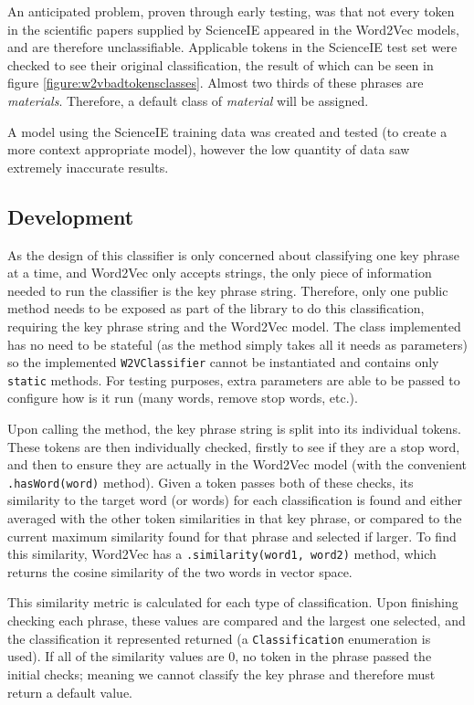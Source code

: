 An anticipated problem, proven through early testing, was that not every token in the scientific papers supplied by ScienceIE appeared in the Word2Vec models, and are therefore unclassifiable. Applicable tokens in the ScienceIE test set were checked to see their original classification, the result of which can be seen in figure \ref{figure:w2vbadtokensclasses}. Almost two thirds of these phrases are \textit{materials}. Therefore, a default class of \textit{material} will be assigned.

A model using the ScienceIE training data was created and tested (to create a more context appropriate model), however the low quantity of data saw extremely inaccurate results.

\subsection{Development}
As the design of this classifier is only concerned about classifying one key phrase at a time, and Word2Vec only accepts strings, the only piece of information needed to run the classifier is the key phrase string. Therefore, only one public method needs to be exposed as part of the library to do this classification, requiring the key phrase string and the Word2Vec model. The class implemented has no need to be stateful (as the method simply takes all it needs as parameters) so the implemented \texttt{W2VClassifier} cannot be instantiated and contains only \texttt{static} methods. For testing purposes, extra parameters are able to be passed to configure how is it run (many words, remove stop words, etc.).

Upon calling the method, the key phrase string is split into its individual tokens. These tokens are then individually checked, firstly to see if they are a stop word, and then to ensure they are actually in the Word2Vec model (with the convenient \texttt{.hasWord(word)} method). Given a token passes both of these checks, its similarity to the target word (or words) for each classification is found and either averaged with the other token similarities in that key phrase, or compared to the current maximum similarity found for that phrase and selected if larger. To find this similarity, Word2Vec has a \texttt{.similarity(word1, word2)} method, which returns the cosine similarity of the two words in vector space. 

This similarity metric is calculated for each type of classification. Upon finishing checking each phrase, these values are compared and the largest one selected, and the classification it represented returned (a \texttt{Classification} enumeration is used). If all of the similarity values are 0, no token in the phrase passed the initial checks; meaning we cannot classify the key phrase and therefore must return a default value.

